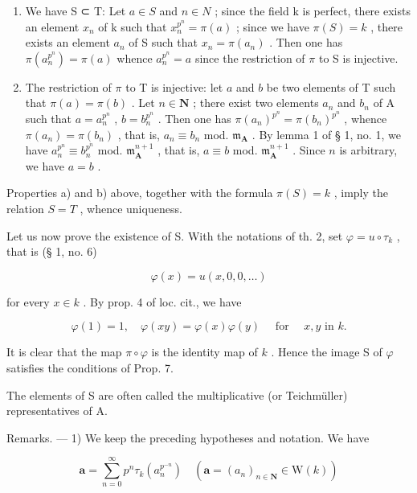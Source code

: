 \begin{enumerate}
\def\labelenumi{\alph{enumi})}
\item
  We have S ⊂ T: Let \(a \in S\) and \(n \in N\) ; since the field k is perfect, there exists an element \(x_{n}\) of k such that \(x_{n}^{p^{n}} = \pi(a)\) ; since we have \(\pi(S) = k\) , there exists an element \(a_{n}\) of S such that \(x_{n} = \pi(a_{n})\) . Then one has \(\pi(a_{n}^{p^{n}}) = \pi(a)\) whence \(a_{n}^{p^{n}} = a\) since the restriction of \(\pi\) to S is injective.
\item
  The restriction of \(\pi\) to T is injective: let \(a\) and \(b\) be two elements of T such that \(\pi(a) = \pi(b)\) . Let \(n \in \mathbf{N}\) ; there exist two elements \(a_n\) and \(b_n\) of A such that \(a = a_n^{p^n}\) , \(b = b_n^{p^n}\) . Then one has \(\pi(a_n)^{p^n} = \pi(b_n)^{p^n}\) , whence \(\pi(a_n) = \pi(b_n)\) , that is, \(a_n \equiv b_n\) mod. \(\mathfrak{m}_{\mathbf{A}}\) . By lemma 1 of § 1, no. 1, we have \(a_n^{p^n} \equiv b_n^{p^n}\) mod. \(\mathfrak{m}_{\mathbf{A}}^{n+1}\) , that is, \(a \equiv b\) mod. \(\mathfrak{m}_{\mathbf{A}}^{n+1}\) . Since \(n\) is arbitrary, we have \(a = b\) .
\end{enumerate}

Properties a) and b) above, together with the formula \(\pi(S) = k\) , imply the relation \(S = T\) , whence uniqueness.

Let us now prove the existence of S. With the notations of th. 2, set \(\varphi = u \circ \tau_k\) , that is (§ 1, no. 6)

\[
\varphi (x) = u (x, 0, 0, \dots)\tag{2}
\]

for every \(x \in k\) . By prop. 4 of loc. cit., we have

\[
\varphi (1) = 1, \quad \varphi (x y) = \varphi (x) \varphi (y) \quad \text { for } \quad x, y \text {   in   } k.\tag{3}
\]

It is clear that the map \(\pi \circ \varphi\) is the identity map of \(k\) . Hence the image S of \(\varphi\) satisfies the conditions of Prop. 7.

The elements of S are often called the multiplicative (or Teichmüller) representatives of A.

Remarks. --- 1) We keep the preceding hypotheses and notation. We have

\[
\boldsymbol {a} = \sum_ {n = 0} ^ {\infty} p ^ {n} \tau_ {k} (a _ {n} ^ {p ^ {- n}}) \quad (\boldsymbol {a} = (a _ {n}) _ {n \in \mathbf {N}} \in \mathrm{W} (k))
\]

